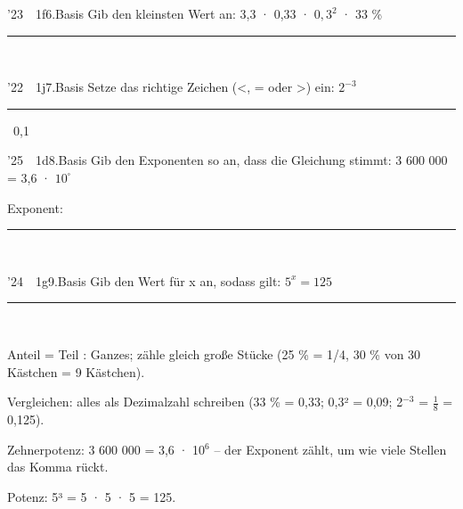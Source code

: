 \documentclass[11pt]{article}
\newcommand{\gkern}[1]{\par\addvspace{14pt}\Needspace*{6\baselineskip}\noindent{\bfseries Kern}\par\nobreak\smallskip
  {\small\raggedright #1\par}}
\newcommand{\gmehr}[1]{\par\addvspace{10pt}\noindent{\footnotesize\color{mbgrau}Mehr: #1 Aufgaben}\par}
\def\gkopfnach{}
\newcommand{\gkopfvor}[1]{\gdef\gkopfnach{#1}}
\newcommand{\linie}[1]{\,{\color{black!45}\rule[-1pt]{#1}{0.4pt}}\,}
\newcommand{\pkt}{\textperiodcentered{}}
\begin{document}
\gkopfvor{\gbstvor{B}\pfstufekopf{Zahlen vergleichen}{\gpunkte[23 22]{\textcolor{black!25}{$\circ$}\,\textcolor{black!25}{$\circ$}\,\textcolor{black!25}{$\circ$}\,\textcolor{black!80}{$\bullet$}\,\textcolor{black!80}{$\bullet$}}}\special{pdf:dest (stufe-zahlen-vergleichen) [@thispage /XYZ @xpos @ypos null]}}
\begin{pfaufg}{’23~\pkt{}~1f}{6.}{Basis}
Gib den kleinsten Wert an: 3,3 · 0,33 · $0{,}3^2$ · 33 \%
\hfill\linie{30mm}
\end{pfaufg}
\begin{pfaufg}{’22~\pkt{}~1j}{7.}{Basis}
Setze das richtige Zeichen (<, = oder >) ein: $2^{ - 3}$ \linie{25mm} 0,1
\end{pfaufg}

\gkopfvor{\gbstvor{C}\pfstufekopf{Potenzen umwandeln}{\gpunkte[25 24 22]{\textcolor{black!25}{$\circ$}\,\textcolor{black!80}{$\bullet$}\,\textcolor{black!80}{$\bullet$}\,\textcolor{black!25}{$\circ$}\,\textcolor{black!80}{$\bullet$}}}\special{pdf:dest (stufe-potenzen-umwandeln) [@thispage /XYZ @xpos @ypos null]}}
\begin{pfaufg}{’25~\pkt{}~1d}{8.}{Basis}
Gib den Exponenten so an, dass die Gleichung stimmt: 3 600 000 = 3,6 · $10^{\square}$
\par\smallskip\par\noindent \hfill Exponent: \linie{30mm}\hphantom{\,cm²}
\end{pfaufg}
\begin{pfaufg}{’24~\pkt{}~1g}{9.}{Basis}
Gib den Wert für x an, sodass gilt: $5^x = 125$
\hfill\linie{30mm}
\end{pfaufg}

\gkern{Anteil = Teil : Ganzes; zähle gleich große Stücke (25 \% = 1/4, 30 \% von 30 Kästchen = 9 Kästchen).\par\smallskip\noindent Vergleichen: alles als Dezimalzahl schreiben (33 \% = 0,33; 0,3² = 0,09; 2$^{-3}$ = $\tfrac{1}{8}$ = 0,125).\par\smallskip\noindent Zehnerpotenz: 3 600 000 = 3,6 · 10$^{6}$ – der Exponent zählt, um wie viele Stellen das Komma rückt.\par\smallskip\noindent Potenz: 5³ = 5 · 5 · 5 = 125.}
\gmehr{18}
\end{document}
